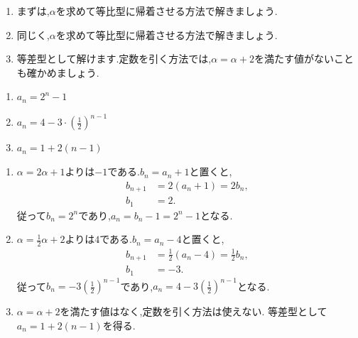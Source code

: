   \noindent{}\par\nobreak
  \begin{enumerate}[label=(\arabic*),parsep=3pt,format=\bookitemlink{example-characteristic-1}{hint}{problem}]
    \item まずは,$\alpha$を求めて等比型に帰着させる方法で解きましょう.
    \item 同じく,$\alpha$を求めて等比型に帰着させる方法で解きましょう.
    \item 等差型として解けます.定数を引く方法では,$\alpha=\alpha+2$を満たす値がないことも確かめましょう.
  \end{enumerate}
  
  \noindent{}\par\nobreak
  \begin{enumerate}[label=(\arabic*),parsep=3pt,format=\bookitemlink{example-characteristic-1}{answer}{problem}]
    \item $\displaystyle a_n=2^n-1$
    \item $\displaystyle a_n=4-3\cdot\left(\frac{1}{2}\right)^{n-1}$
    \item $\displaystyle a_n=1+2(n-1)$
  \end{enumerate}
  
  \noindent{}\par\nobreak
  \begin{enumerate}[label=(\arabic*),parsep=3pt,format=\bookitemlink{example-characteristic-1}{solution}{problem}]
    \item $\alpha=2\alpha+1$よりは$-1$である.$b_n=a_n+1$と置くと,
      \[
        \begin{aligned}
          b_{n+1}&=2(a_n+1)=2b_n,\\
          b_1&=2.
        \end{aligned}
      \]
      従って$b_n=2^n$であり,$a_n=b_n-1=2^n-1$となる.
    \item $\alpha=\frac12\alpha+2$よりは$4$である.$b_n=a_n-4$と置くと,
      \[
        \begin{aligned}
          b_{n+1}&=\frac12(a_n-4)=\frac12b_n,\\
          b_1&=-3.
        \end{aligned}
      \]
      従って$b_n=-3(\frac12)^{n-1}$であり,$a_n=4-3(\frac12)^{n-1}$となる.
    \item $\alpha=\alpha+2$を満たす値はなく,定数を引く方法は使えない.
      等差型として$a_n=1+2(n-1)$を得る.
  \end{enumerate}

